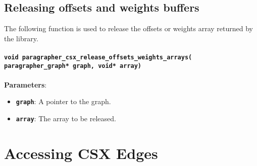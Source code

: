 \documentclass[a4paper]{article}
\begin{document}
\subsection{Releasing offsets and weights buffers}
The following function is used to release the offsets or weights array returned by the library.
\\
\\
\textbf{\texttt{void paragrapher\_csx\_release\_offsets\_weights\_arrays(
\\{\indent}paragrapher\_graph* graph, void* array)}}
\\
\\
\textbf{Parameters}:
\begin{itemize}
    \setlength{\itemsep}{0pt}
    \setlength{\parskip}{0pt}
    \setlength{\parsep}{0pt}

    \item \textbf{\texttt{graph}}: A pointer to the graph.
    \item \textbf{\texttt{array}}: The array to be released.
\end{itemize}


\section{Accessing CSX Edges}
\end{document}
